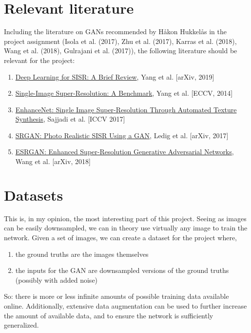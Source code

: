 \documentclass{article}
\begin{document}
\section{Relevant literature}

Including the literature on GANs recommended by Håkon Hukkelås in the project assignment (Isola et al. (2017), Zhu et al. (2017), Karras et al. (2018), Wang et al. (2018), Gulrajani et al. (2017)), the following literature should be relevant for the project:

\begin{enumerate}
    \item \href{https://arxiv.org/pdf/1808.03344.pdf}{Deep Learning for SISR: A Brief Review}, Yang et al. [arXiv, 2019]
    \item \href{https://eng.ucmerced.edu/people/cyang35/ECCV14/eccv14_SingleImageSuperResolutionABenchmark.pdf}{Single-Image Super-Resolution: A Benchmark}, Yang et al. [ECCV, 2014]
    \item \href{http://webdav.tuebingen.mpg.de/pixel/enhancenet/}{EnhanceNet: Single Image Super-Resolution Through Automated Texture Synthesis}, Sajjadi et al. [ICCV 2017]
    \item \href{https://arxiv.org/pdf/1609.04802.pdf}{SRGAN: Photo Realistic SISR Using a GAN}, Ledig et al. [arXiv, 2017] 
    \item \href{https://arxiv.org/pdf/1809.00219.pdf}{ESRGAN: Enhanced Super-Resolution Generative Adversarial Networks}, Wang et al. [arXiv, 2018]
\end{enumerate}

\section{Datasets}
This is, in my opinion, the most interesting part of this project. Seeing as images can be easily downsampled, we can in theory use virtually any image to train the network. 
Given a set of images, we can create a dataset for the project where,
\begin{enumerate} 
    \item the ground truths are the images themselves
    \item the inputs for the GAN are downsampled versions of the ground truths (possibly with added noise)
\end{enumerate}

So: there is more or less infinite amounts of possible training data available online. Additionally, extensive data augmentation can be used to further increase the amount of available data, and to ensure the network is sufficiently generalized. \\
\end{document}
